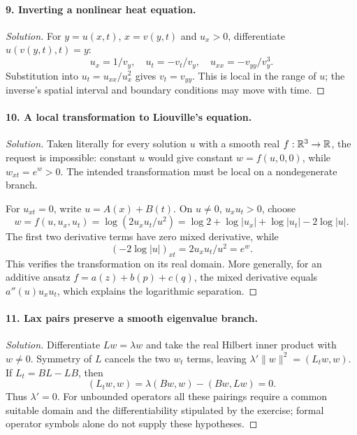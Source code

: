 \Needspace{30mm}
\paragraph{9. Inverting a nonlinear heat equation.}
\begin{proof}[Solution]
For $y=u(x,t)$, $x=v(y,t)$ and $u_x>0$, differentiate
$u(v(y,t),t)=y$:
\[
 u_x=1/v_y,\quad u_t=-v_t/v_y,\quad u_{xx}=-v_{yy}/v_y^3.
\]
Substitution into $u_t=u_{xx}/u_x^2$ gives $v_t=v_{yy}$.
This is local in the range of $u$; the inverse's spatial interval
and boundary conditions may move with time.
\end{proof}

\Needspace{30mm}
\paragraph{10. A local transformation to Liouville's equation.}
\begin{proof}[Solution]
Taken literally for every solution $u$ with a smooth real
$f:\mathbb{R}^3\to\mathbb{R}$, the request is impossible: constant $u$ would give
constant $w=f(u,0,0)$, while $w_{xt}=e^w>0$.
The intended transformation must be local on a nondegenerate branch.

For $u_{xt}=0$, write $u=A(x)+B(t)$.
On $u\ne0$, $u_xu_t>0$, choose
\[
 w=f(u,u_x,u_t)=\log(2u_xu_t/u^2)
        =\log2+\log|u_x|+\log|u_t|-2\log|u|.
\]
The first two derivative terms have zero mixed derivative, while
\[
 (-2\log|u|)_{xt}=2u_xu_t/u^2=e^w .
\]
This verifies the transformation on its real domain.
More generally, for an additive ansatz $f=a(z)+b(p)+c(q)$,
the mixed derivative equals $a''(u)u_xu_t$,
which explains the logarithmic separation.
\end{proof}
\Needspace{45mm}

\Needspace{30mm}
\paragraph{11. Lax pairs preserve a smooth eigenvalue branch.}
\begin{proof}[Solution]
Differentiate $Lw=\lambda w$ and take the real Hilbert inner
product with $w\ne0$.
Symmetry of $L$ cancels the two $w_t$ terms, leaving
$\lambda'\|w\|^2=(L_tw,w)$.
If $L_t=BL-LB$, then
\[
 (L_tw,w)=\lambda(Bw,w)-(Bw,Lw)=0.
\]
Thus $\lambda'=0$.
For unbounded operators all these pairings require a common
suitable domain and the differentiability stipulated by the exercise;
formal operator symbols alone do not supply these hypotheses.
\end{proof}

